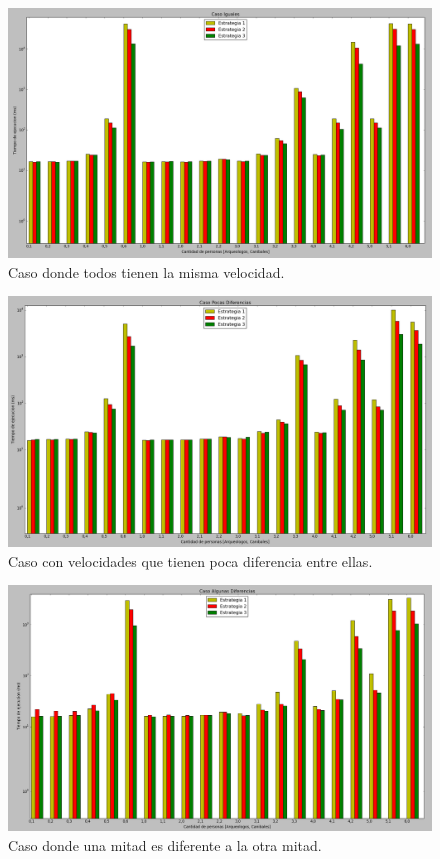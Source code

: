 \begin {figure} [H]
\begin {center}
 \includegraphics[width=1\textwidth,natwidth=610,natheight=642]{images/iguales.png}
 \caption{Caso donde todos tienen la misma velocidad.}
\end {center}
 \end{figure}
 \begin {figure} [H]
\begin {center}
 \includegraphics[width=1\textwidth,natwidth=610,natheight=642]{images/pocas_diferencias.png}
 \caption{Caso con velocidades que tienen poca diferencia entre ellas.}
\end {center}
 \end{figure}
 \begin {figure} [H]
\begin {center}
 \includegraphics[width=1\textwidth,natwidth=610,natheight=642]{images/algunas_diferencias.png}
 \caption{Caso donde una mitad es diferente a la otra mitad.}
\end {center}
 \end{figure}

